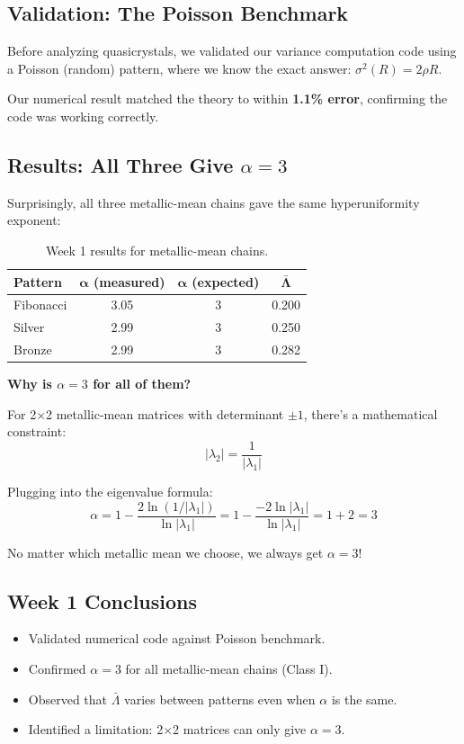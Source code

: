 \documentclass[11pt,letterpaper]{article}
\begin{document}
\subsection{Validation: The Poisson Benchmark}

Before analyzing quasicrystals, we validated our variance computation code using a Poisson (random) pattern, where we know the exact answer: $\sigma^2(R) = 2\rho R$.

Our numerical result matched the theory to within \textbf{1.1\% error}, confirming the code was working correctly.

\subsection{Results: All Three Give $\alpha = 3$}

Surprisingly, all three metallic-mean chains gave the same hyperuniformity exponent:

\begin{table}[H]
\centering
\begin{tabular}{lccc}
\toprule
\textbf{Pattern} & $\boldsymbol{\alpha}$ (measured) & $\boldsymbol{\alpha}$ (expected) & $\boldsymbol{\bar{\Lambda}}$ \\
\midrule
Fibonacci & 3.05 & 3 & 0.200 \\
Silver & 2.99 & 3 & 0.250 \\
Bronze & 2.99 & 3 & 0.282 \\
\bottomrule
\end{tabular}
\caption{Week 1 results for metallic-mean chains.}
\end{table}

\textbf{Why is $\alpha = 3$ for all of them?}

For 2$\times$2 metallic-mean matrices with determinant $\pm 1$, there's a mathematical constraint:
\[
|\lambda_2| = \frac{1}{|\lambda_1|}
\]

Plugging into the eigenvalue formula:
\[
\alpha = 1 - \frac{2\ln(1/|\lambda_1|)}{\ln|\lambda_1|} = 1 - \frac{-2\ln|\lambda_1|}{\ln|\lambda_1|} = 1 + 2 = 3
\]

No matter which metallic mean we choose, we always get $\alpha = 3$!

\subsection{Week 1 Conclusions}

\begin{itemize}
    \item Validated numerical code against Poisson benchmark.
    \item Confirmed $\alpha = 3$ for all metallic-mean chains (Class I).
    \item Observed that $\bar{\Lambda}$ varies between patterns even when $\alpha$ is the same.
    \item Identified a limitation: 2$\times$2 matrices can only give $\alpha = 3$.
\end{itemize}
\end{document}
